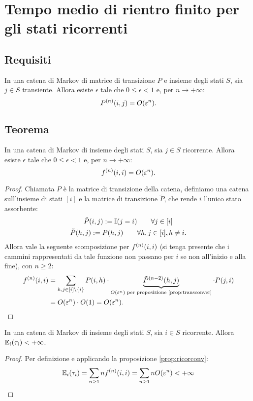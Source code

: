 \section{Tempo medio di rientro finito per gli stati ricorrenti}


\subsection{Requisiti}
\begin{prop}\label{prop:transconver}
	In una catena di Markov di matrice di transizione $P$ e insieme degli stati $S$, sia $j\in S$ transiente. Allora esiste $\epsilon$ tale che $0\le\epsilon<1$ e, per $n\to+\infty$:
	\begin{equation*}
		P^{(n)}(i,j) = O(\varepsilon^n) \text.
	\end{equation*}
\end{prop}


\subsection{Teorema}
\begin{prop}\label{prop:ricorconv}
	In una catena di Markov di insieme degli stati $S$, sia $j\in S$ ricorrente. Allora esiste $\epsilon$ tale che $0\le\epsilon<1$ e, per $n\to+\infty$:
	\begin{equation*}
		f^{(n)}(i,i) = O(\varepsilon^n) \text.
	\end{equation*}
\end{prop}
\begin{proof}
	Chiamata $P$ è la matrice di transizione della catena, definiamo una catena sull'insieme di stati $[i]$ e la matrice di transizione $\tilde P$, che rende $i$ l'unico stato assorbente:
	\begin{gather*}
		\tilde P(i,j) := \mathbb I(j=i) \qquad\forall j\in[i] \\
		\tilde P(h,j) := P(h,j) \qquad\forall h,j\in[i], h\neq i \text.
	\end{gather*}
	Allora vale la seguente scomposizione per $f^{(n)}(i,i)$ (si tenga presente che i cammini rappresentati da tale funzione non passano per $i$ se non all'inizio e alla fine), con $n\ge2$:
	\begin{align*}
		f^{(n)}(i,i) & = \sum_{h,j\in[i]\setminus\{i\}} P(i,h)\cdot\underbrace{\tilde P^{(n-2)}(h,j)}_{O(\varepsilon^n)\text{ per proposizione \ref{prop:transconver}}}\cdot P(j,i) \\
		              & = O(\varepsilon^n)\cdot O(1) = O(\varepsilon^n) \text. \qedhere
	\end{align*}
\end{proof}

\begin{thm}
	In una catena di Markov di insieme degli stati $S$, sia $i\in S$ ricorrente. Allora $\mathbb E_i(\tau_i)<+\infty$.
\end{thm}
\begin{proof}
	Per definizione e applicando la proposizione \ref{prop:ricorconv}:
	\begin{equation*}
		\mathbb E_i(\tau_i) = \sum_{n\ge1} nf^{(n)}(i,i) = \sum_{n\ge1} nO(\varepsilon^n) < +\infty
	\end{equation*}
\end{proof}
